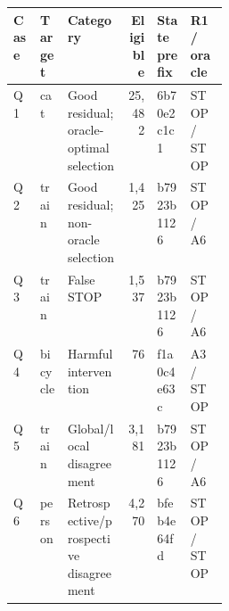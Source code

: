 \begin{center}
\begin{minipage}{\linewidth}
\centering\small
\setlength{\tabcolsep}{3pt}
\label{tab:qualitative}
\begin{tabular}{llp{0.28\linewidth}rll}
\toprule
Case & Target & Category & Eligible & State prefix & R1 / oracle \\
\midrule
Q1 & cat & Good residual; oracle-optimal selection & 25,482 & 6b70e2c1c1 & STOP / STOP \\
Q2 & train & Good residual; non-oracle selection & 1,425 & b7923b1126 & STOP / A6 \\
Q3 & train & False STOP & 1,537 & b7923b1126 & STOP / A6 \\
Q4 & bicycle & Harmful intervention & 76 & f1a0c4e63c & A3 / STOP \\
Q5 & train & Global/local disagreement & 3,181 & b7923b1126 & STOP / A6 \\
Q6 & person & Retrospective/prospective disagreement & 4,270 & bfeb4e64fd & STOP / STOP \\
\bottomrule
\end{tabular}
\end{minipage}
\end{center}
